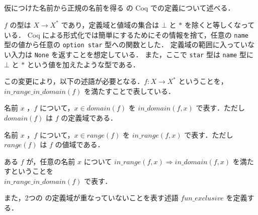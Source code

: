 


\subsection{\tmp}

仮につけた名前から正規の名前を得る \tmp の Coq での定義について述べる．

\tmp $ f $ の型は $X \rightarrow X^* $ であり，定義域と値域の集合は $\bot$ と $\ast$ を除くと等しくなっている．
Coq による形式化では簡単にするためにその情報を捨て，任意の {\tt name} 型の値から任意の {\tt option star} 型への関数とした．
定義域の範囲に入っていない入力は {\tt None} を返すことを想定している．
また，ここで {\tt star} 型は {\tt name} 型に $\bot$ と $\ast$ という値を加えたような型である．

この変更により，以下の述語が必要となる．$f : X \rightarrow X^*$ ということを，$in\_range\_in\_domain(f)$ を満たすことで表している．

\begin{dfn}[$in\_domain$]
  名前 $x$ ，\tmp $f$ について，$x \in domain(f)$ を $in\_domain(f,x)$ で表す．ただし $domain(f)$ は $f$ の定義域である．
\end{dfn}

\begin{dfn}[$in\_range$]
  名前 $x$ ，\tmp $f$ について，$x \in range(f)$ を $in\_range(f,x)$ で表す．ただし $range(f)$ は $f$ の値域である．
\end{dfn}

\begin{dfn}
  ある \tmp $f$ が，任意の名前 $x$ について $in\_range(f, x) \Rightarrow in\_domain(f, x)$ を満たすということを \\
  $in\_range\_in\_domain(f)$ で表す．
\end{dfn}


また，2つの \tmp の定義域が重なっていないことを表す述語 $fun\_exclusive$ を定義する．

